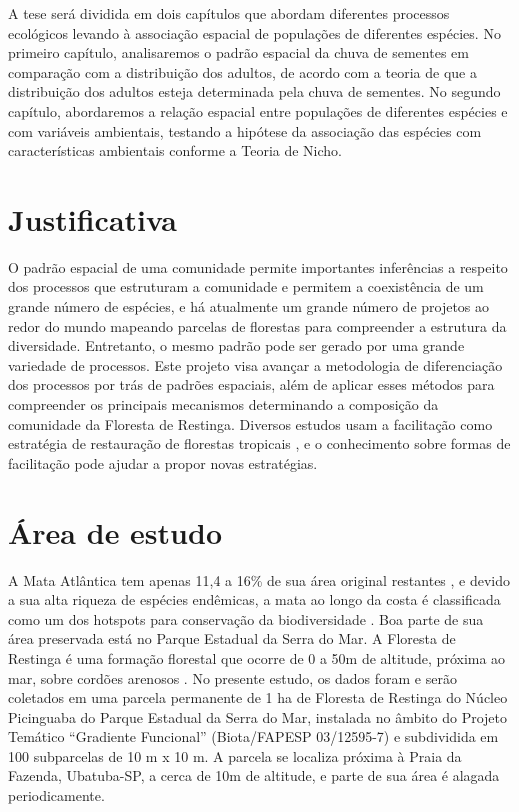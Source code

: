 \documentclass[twoside,12pt,a4paper]{report}
\begin{document}
A tese será dividida em dois capítulos que abordam diferentes processos ecológicos levando à
associação espacial de populações de diferentes espécies. No primeiro capítulo, analisaremos o
padrão espacial da chuva de sementes em comparação com a distribuição dos adultos, de acordo com a
teoria de que a distribuição dos adultos esteja determinada pela chuva de sementes. No segundo
capítulo, abordaremos a relação espacial entre populações de diferentes espécies e com variáveis
ambientais, testando a hipótese da associação das espécies com características ambientais conforme a
Teoria de Nicho.


\section{Justificativa}

O padrão espacial de uma comunidade permite importantes inferências a respeito dos processos que
estruturam a comunidade e permitem a coexistência de um grande número de espécies, e há atualmente
um grande número de projetos ao redor do mundo mapeando parcelas de florestas para compreender a
estrutura da diversidade. Entretanto, o mesmo padrão pode ser gerado por uma grande variedade de
processos. Este projeto visa avançar a metodologia de diferenciação dos processos por trás de
padrões espaciais, além de aplicar esses métodos para compreender os principais mecanismos
determinando a composição da comunidade da Floresta de Restinga. Diversos estudos usam a facilitação
como estratégia de restauração de florestas tropicais \citep{Zwiener2014,ref}, e o
conhecimento sobre formas de facilitação pode ajudar a propor novas estratégias.

\section{Área de estudo}
A Mata Atlântica tem apenas 11,4 a 16\% de sua área original restantes \citep{Ribeiro2009}, e
devido a sua alta riqueza de espécies endêmicas, a mata ao longo da costa é classificada como um dos
hotspots para conservação da biodiversidade \citep{Myers2000}. Boa parte de sua área preservada
está no Parque Estadual da Serra do Mar. A Floresta de Restinga é uma formação florestal que ocorre
de 0 a 50m de altitude, próxima ao mar, sobre cordões arenosos \citep{Joly2008}. No presente
estudo, os dados foram e serão coletados em uma parcela permanente de 1 ha de Floresta de Restinga
do Núcleo Picinguaba do Parque Estadual da Serra do Mar, instalada no âmbito do Projeto Temático
“Gradiente Funcional” (Biota/FAPESP 03/12595-7) e subdividida em 100 subparcelas de 10 m x 10 m. A
parcela se localiza próxima à Praia da Fazenda, Ubatuba-SP, a cerca de 10m de altitude, e parte de
sua área é alagada periodicamente.
\end{document}
